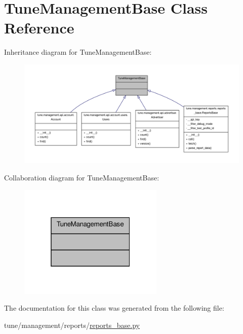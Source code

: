 \hypertarget{classTuneManagementBase}{\section{Tune\-Management\-Base Class Reference}
\label{classTuneManagementBase}
}


Inheritance diagram for Tune\-Management\-Base\-:
\nopagebreak
\begin{figure}[H]
\begin{center}
\leavevmode
\includegraphics[width=350pt]{classTuneManagementBase__inherit__graph}
\end{center}
\end{figure}


Collaboration diagram for Tune\-Management\-Base\-:
\nopagebreak
\begin{figure}[H]
\begin{center}
\leavevmode
\includegraphics[width=196pt]{classTuneManagementBase__coll__graph}
\end{center}
\end{figure}


The documentation for this class was generated from the following file\-:\begin{DoxyCompactItemize}
\item 
tune/management/reports/\hyperlink{reports__base_8py}{reports\-\_\-base.\-py}\end{DoxyCompactItemize}
